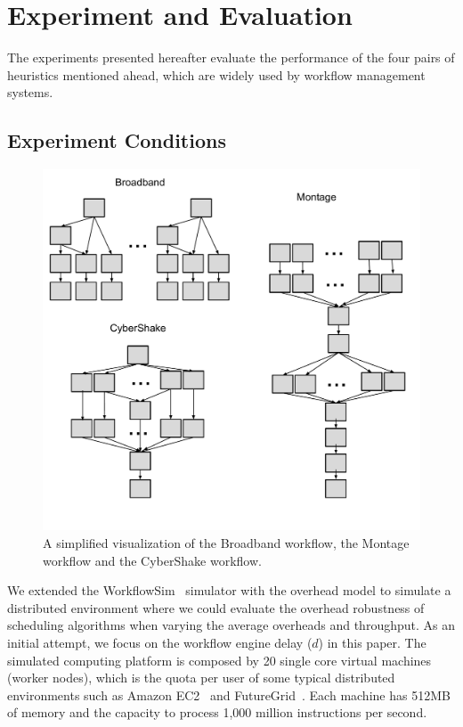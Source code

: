 \documentclass[final,5p,times,twocolumn]{elsarticle}
\begin{document}
\section{Experiment and Evaluation}
\label{sec:experiments}

The experiments presented hereafter evaluate the performance of the four pairs of heuristics mentioned ahead, which are widely used by workflow management systems. 

\subsection{Experiment Conditions}


\begin{figure}[htb]
	\centering
	\includegraphics[width=1.0\linewidth]{figure/shape.pdf} 
	\caption{A simplified visualization of the Broadband workflow, the Montage workflow and the CyberShake workflow.}
	\label{fig:shape}
	\vspace{-10pt}
\end{figure}

We extended the WorkflowSim~\cite{WorkflowSim} simulator with the overhead model to simulate a distributed environment where we could evaluate the overhead robustness of scheduling algorithms when varying the average overheads and throughput. As an initial attempt, we focus on the workflow engine delay ($d$) in this paper. The simulated computing platform is composed by 20 single core virtual machines (worker nodes), which is the quota per user of some typical distributed environments such as Amazon EC2~\cite{AmazonAWS} and FutureGrid~\cite{FutureGrid}. Each machine has 512MB of memory and the capacity to process 1,000 million instructions per second. 
\end{document}
